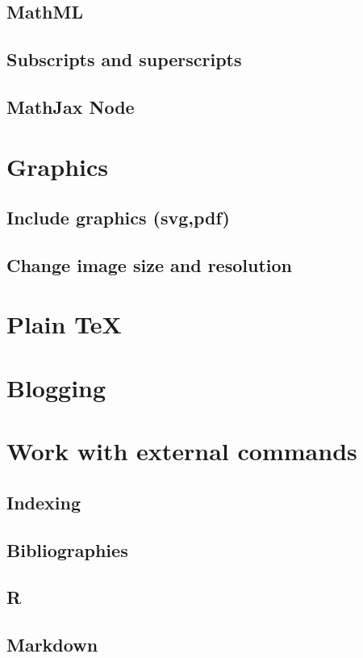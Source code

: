 \documentclass{book}
\begin{document}
\subsection{MathML}
\subsection{Subscripts and superscripts}

\subsection{MathJax Node}


\section{Graphics}
\subsection{Include graphics (svg,pdf)}
\subsection{Change image size and resolution}


\section{Plain \TeX}



\section{Blogging}

\section{Work with external commands}
\subsection{Indexing}
\subsection{Bibliographies}
\subsection{R}
\subsection{Markdown}
\end{document}
